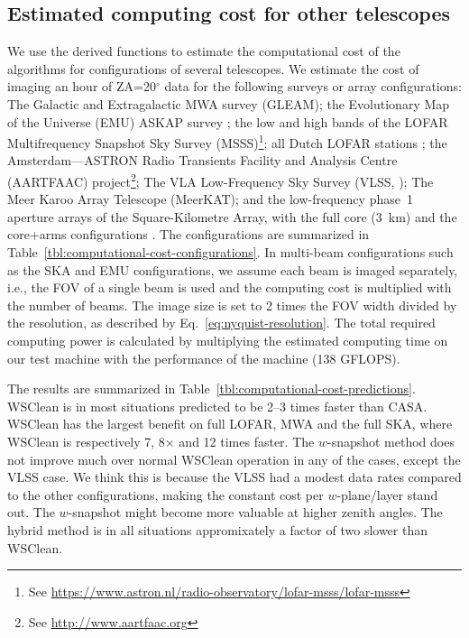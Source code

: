 \documentclass[useAMS,usenatbib]{mn2e}
\newcommand{\degree}{\ensuremath{^{\circ}}\xspace}
\begin{document}
\subsection{Estimated computing cost for other telescopes} \label{sec:application-to-nonmwa}
We use the derived functions to estimate the computational cost of the algorithms for configurations of several telescopes. We estimate the cost of imaging an hour of ZA=20\degree data for the following surveys or array configurations: The Galactic and Extragalactic MWA survey (GLEAM); the Evolutionary Map of the Universe (EMU) ASKAP survey \citep{emu-norris-2011}; the low and high bands of the LOFAR Multifrequency Snapshot Sky Survey (MSSS)\footnote{See \url{https://www.astron.nl/radio-observatory/lofar-msss/lofar-msss}}; all Dutch LOFAR stations \citep{lofar-2013}; the Amsterdam—ASTRON Radio Transients Facility and Analysis Centre (AARTFAAC) project\footnote{See \url{http://www.aartfaac.org}}; The VLA Low-Frequency Sky Survey (VLSS, \citealt{vlss-2007}); The Meer Karoo Array Telescope (MeerKAT); and the low-frequency phase~1 aperture arrays of the Square-Kilometre Array, with the full core (3~km) and the core+arms configurations \citep{ska-phase1-2013}. The configurations are summarized in Table~\ref{tbl:computational-cost-configurations}. In multi-beam configurations such as the SKA and EMU configurations, we assume each beam is imaged separately, i.e., the FOV of a single beam is used and the computing cost is multiplied with the number of beams. The image size is set to 2 times the FOV width divided by the resolution, as described by Eq.~\ref{eq:nyquist-resolution}. The total required computing power is calculated by multiplying the estimated computing time on our test machine with the performance of the machine (138 GFLOPS).

The results are summarized in Table~\ref{tbl:computational-cost-predictions}. WSClean is in most situations predicted to be 2--3 times faster than CASA. WSClean has the largest benefit on full LOFAR, MWA and the full SKA, where WSClean is respectively 7, 8$\times$ and 12 times faster. The $w$-snapshot method does not improve much over normal WSClean operation in any of the cases, except the VLSS case. We think this is because the VLSS had a modest data rates compared to the other configurations, making the constant cost per $w$-plane/layer stand out. The $w$-snapshot might become more valuable at higher zenith angles. The hybrid method is in all situations appromixately a factor of two slower than WSClean.
\end{document}
